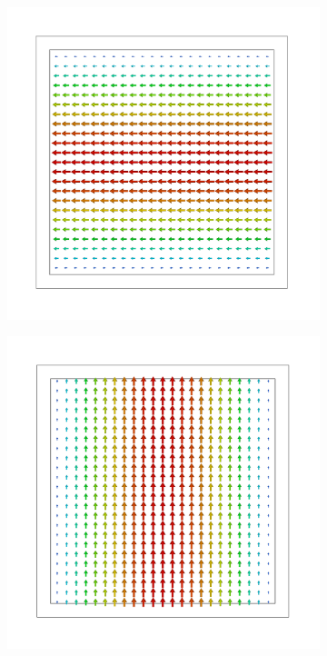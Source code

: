 \documentclass[11pt,a4paper,twoside,openany]{report}
\begin{document}
\begin{figure}[!ht]
    \centering
    \begin{subfigure}{.45\textwidth}
        \centering
        \includegraphics[width=.75\textwidth]{src/waveguide_square_mode1.png}
        \caption{\label{fig:square-waveguide-mode1}}
    \end{subfigure}
    \hspace{0.5cm}
    \begin{subfigure}{.45\textwidth}
        \centering
        \includegraphics[width=.75\textwidth]{src/waveguide_square_mode2.png}
        \caption{\label{fig:square-waveguide-mode2}}
    \end{subfigure}
    \\

\end{figure}
\end{document}
